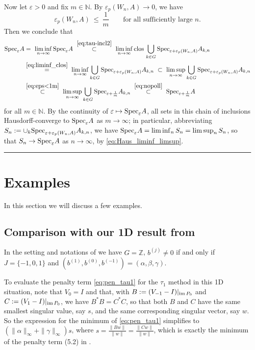 \documentclass{article}
\newcommand\Marko[1]{\marginpar{\textcolor{blue}{\tt #1}}}
\newcommand\N{{\mathbb N}}
\newcommand\Z{{\mathbb Z}}
\newcommand\eps{{\varepsilon}}
\newcommand\Specn{{\rm Spec}}   %
\newcommand\Speps{{\rm Spec}_\eps}
\newcommand\clos{{\rm clos\,}}
\newcommand\im{{\rm im\,}}
\newcommand\Proofend{\rule{2mm}{2mm}}
\renewenvironment{proof}
 {\par\noindent{\bf Proof.}}
 {\Proofend\par\pagebreak[2]}
\numberwithin{equation}{section}   %
\numberwithin{figure}{section}  %
\begin{document}
\begin{proof}
Now let $\eps>0$ and fix $m\in\N$. By $\eps_p(W_n,A)\to 0$,  we have 
\begin{equation} \label{eq:eps<1m}
\eps_p(W_n,A)\ \le\ \frac1m
\qquad\text{for all sufficiently large } n.
\end{equation}
Then we conclude that
\begin{align*}
\Speps A &=\ \liminf_{n\to\infty} \Speps A\ \stackrel{\eqref{eq:tau-incl2}}\subset\ \liminf_{n\to\infty}\clos\bigcup\limits_{k\in G} \Specn_{\eps+\eps_p(W_n,A)} A_{k,n}\\
&\stackrel{\eqref{eq:liminf_clos}}=\ \liminf_{n\to\infty}\bigcup\limits_{k\in G} \Specn_{\eps+\eps_p(W_n,A)} A_{k,n}\ \subset\ \limsup_{n\to\infty} \bigcup\limits_{k\in G} \Specn_{\eps+\eps_p(W_n,A)} A_{k,n}\\ 
&\stackrel{\eqref{eq:eps<1m}}\subset\ \limsup_{n\to\infty} \bigcup\limits_{k\in G} \Specn_{\eps+\frac1m} A_{k,n}
\ \stackrel{\eqref{eq:nopoll}}\subset\ \Specn_{\eps+\frac1m}A
\end{align*}
for all $m\in\N$. By the continuity of $\eps\mapsto \Speps A$, all sets in this chain of inclusions Hausdorff-converge to $\Speps A$ as $m\to\infty$;
in particular, abbreviating $S_n:=\cup_k \Specn_{\eps+\eps_p(W_n,A)} A_{k,n}$, we have $\Speps A=\liminf_n S_n=\limsup_n S_n$, so that $S_n\to \Speps A$ as $n\to\infty$, by \eqref{eq:Haus_liminf_limsup}.
\end{proof}

\section{Examples}
\label{sec:examples}

In this section we will discuss a few examples.

\subsection{Comparison with our 1D result from \texorpdfstring{\cite{CW.Heng.ML:JST}}{\ref{bib-CW.Heng.ML:JST}}}
In the setting and notations of \cite{CW.Heng.ML:JST} we have $G=\Z$, $b^{(j)} \neq 0$ if and only if $J=\{-1,0,1\}$ and $(b^{(1)},b^{(0)},b^{(-1)})=(\alpha,\beta,\gamma)$.

To evaluate the penalty term \eqref{eq:pen_tau1} for the $\tau_1$ method in this 1D situation, note that $V_0=I$ and that, with $B:=(V_{-1}-I)|_{\im P_0}$ and $C:=(V_1-I)|_{\im P_0}$, we have $B^*B=C^*C$, so that both $B$ and $C$ have the same smallest singular value, say $s$, and the same corresponding singular vector, say $w$. So the expression for the minimum of \eqref{eq:pen_tau1} simplifies to $(\|\alpha\|_\infty+\|\gamma\|_\infty)s$, where $s=\frac{\|Bw\|}{\|w\|}=\frac{\|Cw\|}{\|w\|}$, which is exactly the minimum of the penalty term (5.2) in \cite[Proposition 5.1]{CW.Heng.ML:JST}.
\end{document}
